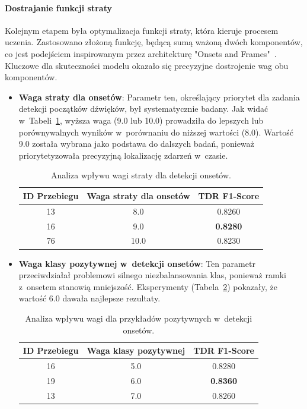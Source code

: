 \paragraph{Dostrajanie funkcji straty}
Kolejnym etapem była optymalizacja funkcji straty, która kieruje procesem uczenia. Zastosowano złożoną funkcję, będącą sumą ważoną dwóch komponentów, co jest podejściem inspirowanym przez architekturę "Onsets and Frames"~\autocite{Hawthorne2018Onsets}. Kluczowe dla skuteczności modelu okazało się precyzyjne dostrojenie wag obu komponentów.

\begin{itemize}
    \item \textbf{Waga straty dla onsetów}: Parametr ten, określający priorytet dla zadania detekcji początków dźwięków, był systematycznie badany. Jak widać w~Tabeli~\ref{tab:waga_straty_onsetow}, wyższa waga (9.0 lub 10.0) prowadziła do lepszych lub porównywalnych wyników w~porównaniu do niższej wartości (8.0). Wartość 9.0 została wybrana jako podstawa do dalszych badań, ponieważ priorytetyzowała precyzyjną lokalizację zdarzeń w~czasie.
    \begin{table}[H]
    \centering
    \caption{Analiza wpływu wagi straty dla detekcji onsetów.}
    \label{tab:waga_straty_onsetow}
    \begin{tabular}{|c|c|c|}
    \hline
    \textbf{ID Przebiegu} & \textbf{Waga straty dla onsetów} & \textbf{TDR F1-Score } \\ \hline
    13 & 8.0 & 0.8260 \\ \hline
    16 & 9.0 & \textbf{0.8280} \\ \hline
    76 & 10.0 & 0.8230\\ \hline
    \end{tabular}
    \end{table}
    
    \item \textbf{Waga klasy pozytywnej w~detekcji onsetów}: Ten parametr przeciwdziałał problemowi silnego niezbalansowania klas, ponieważ ramki z~onsetem stanowią mniejszość. Eksperymenty (Tabela~\ref{tab:waga_klasy_pozytywnej}) pokazały, że wartość 6.0 dawała najlepsze rezultaty.
    
    \begin{table}[H]
    \centering
    \caption{Analiza wpływu wagi dla przykładów pozytywnych w~detekcji onsetów.}
    \label{tab:waga_klasy_pozytywnej}
    \begin{tabular}{|c|c|c|}
    \hline
    \textbf{ID Przebiegu} & \textbf{Waga klasy pozytywnej} & \textbf{TDR F1-Score } \\ \hline
    16 & 5.0 & 0.8280 \\ \hline
    19 & 6.0 & \textbf{0.8360} \\ \hline
    13 & 7.0 & 0.8260 \\ \hline
    \end{tabular}
    \end{table}
\end{itemize}

